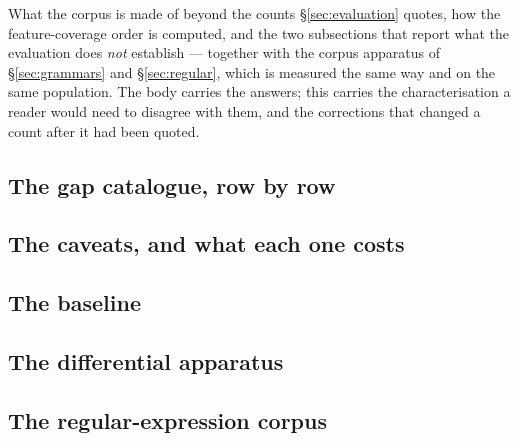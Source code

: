 
What the corpus is made of beyond the counts \S\ref{sec:evaluation} quotes, how the
feature-coverage order is computed, and the two subsections that report what the
evaluation does \emph{not} establish --- together with the corpus apparatus of
\S\ref{sec:grammars} and \S\ref{sec:regular}, which is measured the same way and on
the same population. The body carries the answers; this carries the characterisation a
reader would need to disagree with them, and the corrections that changed a count after
it had been quoted.








\subsection{The gap catalogue, row by row}
\label{sec:app-gap-rows}








\subsection{The caveats, and what each one costs}
\label{sec:app-caveat-detail}





\subsection{The baseline}
\label{sec:app-baseline}


\subsection{The differential apparatus}
\label{sec:app-differential}





\subsection{The regular-expression corpus}
\label{sec:app-regex-corpus}





